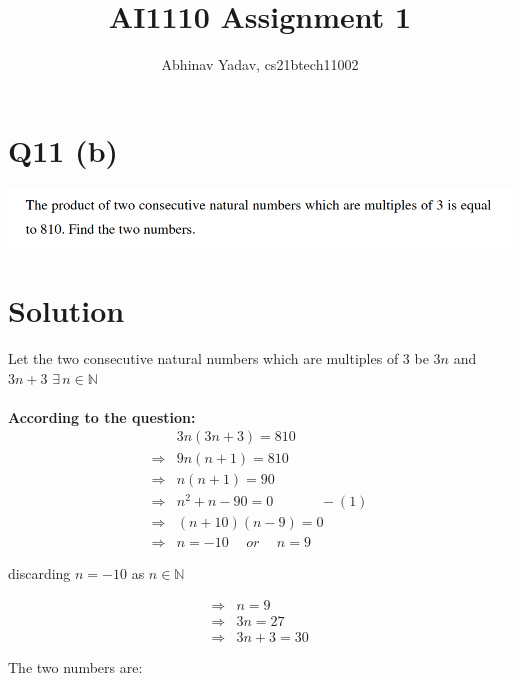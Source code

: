 \documentclass[11pt, a4paper]{article}
\title{AI1110 Assignment 1}
\author{Abhinav Yadav, cs21btech11002}
\begin{document}
    \maketitle
    \section*{Q11 (b)}
    \includegraphics[width=\textwidth]{q11_b.png}
    \section*{Solution}
    Let the two consecutive natural numbers which are multiples of $3$ be $3n$ and $3n+3$
    \hspace{5pt} $\exists \hspace{2pt} n \in \mathbb{N}$\\\\
    \textbf{According to the question:}
    \begin{align*}
        & 3n(3n+3) = 810\\
        \Rightarrow & 9n(n+1)=810\\
        \Rightarrow & n(n+1)=90\\
        \Rightarrow & n^2+n-90=0\hspace{40pt} -(1)\\
        \Rightarrow & (n+10)(n-9)=0\\
        \Rightarrow & n=-10 \hspace{15pt} or \hspace{15pt} n=9
    \end{align*}
    \begin{center}
        discarding $n=-10$ as $n \in \mathbb{N}$
    \end{center}
    \begin{equation*}
        \begin{split}
            \Rightarrow & n=9\\
            \Rightarrow & 3n=27\\
            \Rightarrow & 3n+3=30\\\\
        \end{split}
    \end{equation*} 
    The two numbers are:\\
    \pagebreak
\end{document}
